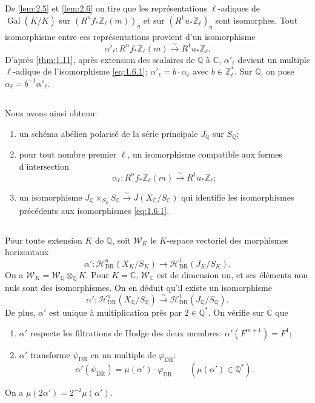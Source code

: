 \documentclass[10pt,leqno]{amsart}
\theoremstyle{plain}
\theoremstyle{definition}
\theoremstyle{remark}
\DeclareMathOperator{\Gal}{Gal}
\newcommand{\ZZ}{\mathbb{Z}}
\newcommand{\QQ}{\mathbb{Q}}
\newcommand{\CC}{\mathbb{C}}
\begin{document}
De \ref{lem:2.5} et \ref{lem:2.6} on tire que les repr\'esentations $\ell$-adiques de $\Gal(\bar{K}/K)$ sur $(R^nf_*\ZZ_\ell(m))_{\bar{\eta}}$ et sur $(R^1u_*\ZZ_\ell)_{\bar{\eta}}$ sont isomorphes. Tout isomorphisme entre ces repr\'esentations provient d'un isomorphisme
\[
\alpha'_\ell\colon R^nf_*\ZZ_\ell(m)\xrightarrow{\sim}R^1u_*\ZZ_\ell.
\]
D'apr\`es \ref{thm:1.11}, apr\`es extension des scalaires de $\QQ$ \`a $\CC$, $\alpha'_\ell$ devient un multiple $\ell$-adique de l'isomorphisme \eqref{eq:1.6.1}: $\alpha'_\ell=b\cdot\alpha_\ell$ avec $b\in\ZZ_\ell^*$. Sur $\QQ$, on pose $\alpha_\ell=b^{-1}\alpha'_\ell$.

\subsection{}\label{2.7}

Nous avons ainsi obtenu:
\begin{enumerate}
\item[a)] un sch\'ema ab\'elien polaris\'e de la s\'erie principale $J_\QQ$ sur $S_\QQ$;
\item[b)] pour tout nombre premier $\ell$, un isomorphisme compatible aux formes d'intersection
\[
\alpha_\ell\colon R^nf_*\ZZ_\ell(m)\xrightarrow{\sim}R^1u_*\ZZ_\ell;
\]
\item[c)] un isomorphisme $J_\QQ\times_{S_\QQ}S_\CC\xrightarrow{\sim}J(X_\CC/S_\CC)$ qui identifie les isomorphismes pr\'ec\'edents aux isomorphismes \eqref{eq:1.6.1}.
\end{enumerate}

\subsection{}\label{2.8}

Pour toute extension $K$ de $\QQ$, soit $\mathscr{W}_K$ le $K$-espace vectoriel des morphismes horizontaux
\[
\alpha'\colon\mathscr{H}^n_{\mathrm{DR}}(X_K/S_K)\to\mathscr{H}^1_{\mathrm{DR}}(J_K/S_K).
\]
On a $\mathscr{W}_K=\mathscr{W}_\QQ\otimes_\QQ K$. Pour $K=\CC$, $\mathscr{W}_\CC$ est de dimension un, et ses \'el\'ements non nuls sont des isomorphismes. On en d\'eduit qu'il existe un isomorphisme
\[
\alpha'\colon\mathscr{H}^n_{\mathrm{DR}}(X_\QQ/S_\QQ)\xrightarrow{\sim}\mathscr{H}^1_{\mathrm{DR}}(J_\QQ/S_\QQ).
\]
De plus, $\alpha'$ est unique \`a multiplication pr\`es par $2\in\QQ^*$. On v\'erifie sur $\CC$ que
\begin{enumerate}
\item[a)] $\alpha'$ respecte les filtrations de Hodge des deux membres: $\alpha'(F^{m+1})=F^1$;
\item[b)] $\alpha'$ transforme $\psi_{\mathrm{DR}}$ en un multiple de $\varphi_{\mathrm{DR}}$:
\[
\alpha'(\psi_{\mathrm{DR}})=\mu(\alpha')\cdot\varphi_{\mathrm{DR}}\qquad(\mu(\alpha')\in\QQ^*).
\]
\end{enumerate}
On a $\mu(2\alpha')=2^{-2}\mu(\alpha')$.
\end{document}
